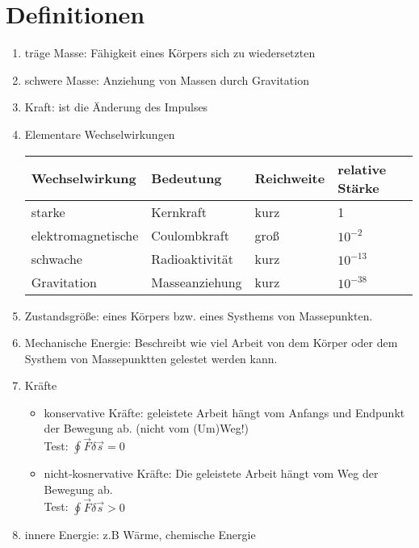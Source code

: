 \documentclass[a4paper,12pt]{scrartcl}
\begin{document}
\section{Definitionen}
\begin{enumerate}
\item träge Masse: Fähigkeit eines Körpers sich zu wiedersetzten
\item schwere Masse: Anziehung von Massen durch Gravitation
\item Kraft: ist die Änderung des Impulses
\item Elementare Wechselwirkungen
\begin{center}
\begin{tabular}{l|l|l|l}
Wechselwirkung & Bedeutung & Reichweite & relative Stärke\\
\hline
starke & Kernkraft & kurz & 1\\
elektromagnetische & Coulombkraft & groß & $10^{-2}$\\
schwache & Radioaktivität & kurz & $10^{-13}$\\
Gravitation & Masseanziehung & kurz & $10^{-38}$\\
\end{tabular}
\end{center}
\item Zustandsgröße: eines Körpers bzw. eines Systhems von Massepunkten. \\
\item Mechanische Energie: Beschreibt wie viel Arbeit von dem Körper oder dem Systhem von Massepunktten gelestet werden kann.
\item Kräfte
\begin{itemize}
\item konservative Kräfte: geleistete Arbeit hängt vom Anfangs und Endpunkt der Bewegung ab. (nicht vom (Um)Weg!)\\
Test: $\oint \overrightarrow{F}\delta\overrightarrow{s}=0$
\item nicht-kosnervative Kräfte: Die geleistete Arbeit hängt vom Weg der Bewegung ab.\\
Test: $\oint \overrightarrow{F}\delta\overrightarrow{s}>0$
\end{itemize}
\item innere Energie: z.B Wärme, chemische Energie\\
\end{enumerate}


\newpage
\end{document}
